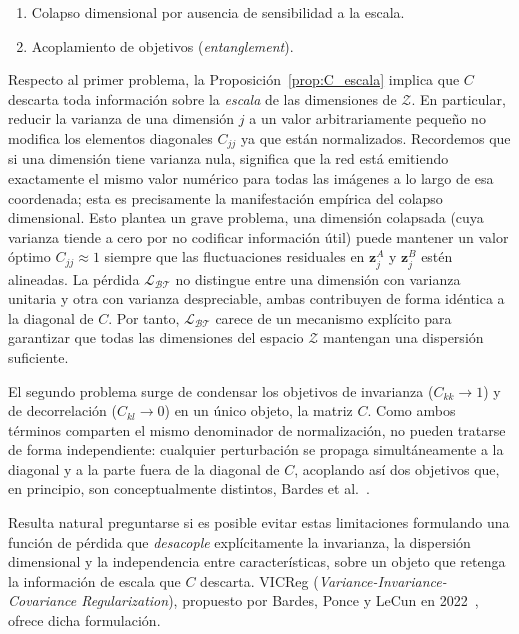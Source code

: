 \begin{enumerate}
    \item Colapso dimensional por ausencia de sensibilidad a la escala.
    \item Acoplamiento de objetivos (\textit{entanglement}).
\end{enumerate}

Respecto al primer problema, la Proposición~\ref{prop:C_escala} implica que $C$ descarta toda información sobre la \emph{escala} de las dimensiones de $\mathcal{Z}$. En particular, reducir la varianza de una dimensión $j$ a un valor arbitrariamente pequeño no modifica los elementos diagonales $C_{jj}$ ya que están normalizados. Recordemos que si una dimensión tiene varianza nula, significa que la red está emitiendo exactamente el mismo valor numérico para todas las imágenes a lo largo de esa coordenada; esta es precisamente la manifestación empírica del colapso dimensional. Esto plantea un grave problema, una dimensión colapsada (cuya varianza tiende a cero por no codificar información útil) puede mantener un valor óptimo $C_{jj} \approx 1$ siempre que las fluctuaciones residuales en $\mathbf{z}_j^A$ y $\mathbf{z}_j^B$ estén alineadas. La pérdida $\mathcal{L}_{\mathcal{BT}}$ no distingue entre una dimensión con varianza unitaria y otra con varianza despreciable, ambas contribuyen de forma idéntica a la diagonal de $C$. Por tanto, $\mathcal{L}_{\mathcal{BT}}$ carece de un mecanismo explícito para garantizar que todas las dimensiones del espacio $\mathcal{Z}$ mantengan una dispersión suficiente.

El segundo problema surge de condensar los objetivos de invarianza ($C_{kk} \to 1$) y de decorrelación ($C_{kl} \to 0$) en un único objeto, la matriz $C$. Como ambos términos comparten el mismo denominador de normalización, no pueden tratarse de forma independiente: cualquier perturbación se propaga simultáneamente a la diagonal y a la parte fuera de la diagonal de $C$, acoplando así dos objetivos que, en principio, son conceptualmente distintos, Bardes et al.~\cite{bardes2022vicreg}.

Resulta natural preguntarse si es posible evitar estas limitaciones formulando una función de pérdida que \emph{desacople} explícitamente la invarianza, la dispersión dimensional y la independencia entre características, sobre un objeto que retenga la información de escala que $C$ descarta. VICReg (\textit{Variance-Invariance-Covariance Regularization}), propuesto por Bardes, Ponce y LeCun en 2022~\cite{bardes2022vicreg}, ofrece dicha formulación.

